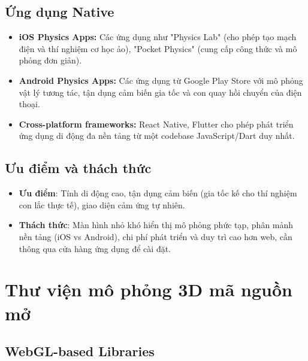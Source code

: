 \subsection{Ứng dụng Native}

\begin{itemize}
    \item \textbf{iOS Physics Apps:} Các ứng dụng như "Physics Lab" (cho phép tạo mạch điện và thí nghiệm cơ học ảo), "Pocket Physics" (cung cấp công thức và mô phỏng đơn giản).
    \item \textbf{Android Physics Apps:} Các ứng dụng từ Google Play Store với mô phỏng vật lý tương tác, tận dụng cảm biến gia tốc và con quay hồi chuyển của điện thoại.
    \item \textbf{Cross-platform frameworks:} React Native, Flutter cho phép phát triển ứng dụng di động đa nền tảng từ một codebase JavaScript/Dart duy nhất.
\end{itemize}

\subsection{Ưu điểm và thách thức}

\begin{itemize}
    \item \textbf{Ưu điểm}: Tính di động cao, tận dụng cảm biến (gia tốc kế cho thí nghiệm con lắc thực tế), giao diện cảm ứng tự nhiên.
    \item \textbf{Thách thức}: Màn hình nhỏ khó hiển thị mô phỏng phức tạp, phân mảnh nền tảng (iOS vs Android), chi phí phát triển và duy trì cao hơn web, cần thông qua cửa hàng ứng dụng để cài đặt.
\end{itemize}

\section{Thư viện mô phỏng 3D mã nguồn mở}

\subsection{WebGL-based Libraries}

